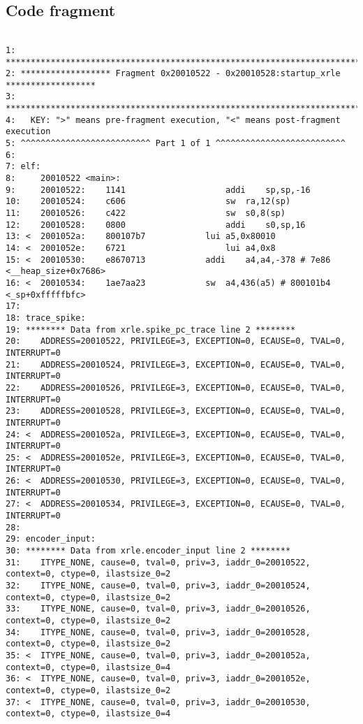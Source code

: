 \subsection{Code fragment}
\begin{lstlisting}[basicstyle=\tiny]

1: ***********************************************************************************
2: ****************** Fragment 0x20010522 - 0x20010528:startup_xrle ******************
3: ***********************************************************************************
4:   KEY: ">" means pre-fragment execution, "<" means post-fragment execution
5: ^^^^^^^^^^^^^^^^^^^^^^^^^^ Part 1 of 1 ^^^^^^^^^^^^^^^^^^^^^^^^^^
6:
7: elf:
8:     20010522 <main>:
9:     20010522:	1141                	addi	sp,sp,-16
10:    20010524:	c606                	sw	ra,12(sp)
11:    20010526:	c422                	sw	s0,8(sp)
12:    20010528:	0800                	addi	s0,sp,16
13: <  2001052a:	800107b7          	lui	a5,0x80010
14: <  2001052e:	6721                	lui	a4,0x8
15: <  20010530:	e8670713          	addi	a4,a4,-378 # 7e86 <__heap_size+0x7686>
16: <  20010534:	1ae7aa23          	sw	a4,436(a5) # 800101b4 <_sp+0xfffffbfc>
17:
18: trace_spike:
19: ******** Data from xrle.spike_pc_trace line 2 ********
20:    ADDRESS=20010522, PRIVILEGE=3, EXCEPTION=0, ECAUSE=0, TVAL=0, INTERRUPT=0
21:    ADDRESS=20010524, PRIVILEGE=3, EXCEPTION=0, ECAUSE=0, TVAL=0, INTERRUPT=0
22:    ADDRESS=20010526, PRIVILEGE=3, EXCEPTION=0, ECAUSE=0, TVAL=0, INTERRUPT=0
23:    ADDRESS=20010528, PRIVILEGE=3, EXCEPTION=0, ECAUSE=0, TVAL=0, INTERRUPT=0
24: <  ADDRESS=2001052a, PRIVILEGE=3, EXCEPTION=0, ECAUSE=0, TVAL=0, INTERRUPT=0
25: <  ADDRESS=2001052e, PRIVILEGE=3, EXCEPTION=0, ECAUSE=0, TVAL=0, INTERRUPT=0
26: <  ADDRESS=20010530, PRIVILEGE=3, EXCEPTION=0, ECAUSE=0, TVAL=0, INTERRUPT=0
27: <  ADDRESS=20010534, PRIVILEGE=3, EXCEPTION=0, ECAUSE=0, TVAL=0, INTERRUPT=0
28:
29: encoder_input:
30: ******** Data from xrle.encoder_input line 2 ********
31:    ITYPE_NONE, cause=0, tval=0, priv=3, iaddr_0=20010522, context=0, ctype=0, ilastsize_0=2
32:    ITYPE_NONE, cause=0, tval=0, priv=3, iaddr_0=20010524, context=0, ctype=0, ilastsize_0=2
33:    ITYPE_NONE, cause=0, tval=0, priv=3, iaddr_0=20010526, context=0, ctype=0, ilastsize_0=2
34:    ITYPE_NONE, cause=0, tval=0, priv=3, iaddr_0=20010528, context=0, ctype=0, ilastsize_0=2
35: <  ITYPE_NONE, cause=0, tval=0, priv=3, iaddr_0=2001052a, context=0, ctype=0, ilastsize_0=4
36: <  ITYPE_NONE, cause=0, tval=0, priv=3, iaddr_0=2001052e, context=0, ctype=0, ilastsize_0=2
37: <  ITYPE_NONE, cause=0, tval=0, priv=3, iaddr_0=20010530, context=0, ctype=0, ilastsize_0=4

\end{lstlisting}
